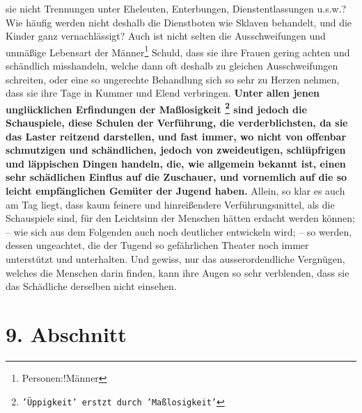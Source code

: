 sie nicht Trennungen unter Eheleuten, Enterbungen, Dienstentlassungen u.s.w.?
Wie häufig werden nicht deshalb die Dienstboten wie 
Sklaven behandelt, und die
Kinder ganz vernachlässigt? Auch ist nicht selten die Ausschweifungen und
unmäßige Lebensart der Männer\footnote{Personen:!Männer} Schuld,
dass sie ihre Frauen gering achten und
schändlich misshandeln, welche dann oft deshalb zu gleichen Ausschweifungen
schreiten, oder eine so ungerechte Behandlung sich so sehr zu Herzen nehmen, dass
sie ihre Tage in Kummer und Elend verbringen.
\label{ref:15_08_schauspiel}
\textbf{Unter allen jenen unglücklichen
Erfindungen der Maßlosigkeit
\footnote{\texttt{'Üppigkeit' erstzt durch 'Maßlosigkeit'}} 
sind jedoch die Schauspiele, diese Schulen der
Verführung, die verderblichsten, da sie das Laster reitzend darstellen, und fast
immer, wo nicht von offenbar schmutzigen und schändlichen, jedoch von
zweideutigen, schlüpfrigen und läppischen Dingen handeln, die, wie allgemein
bekannt ist, einen sehr schädlichen Einflus auf die Zuschauer, und vornemlich
auf die so leicht empfänglichen Gemüter der Jugend haben.} Allein, so klar es
auch am Tag liegt, dass kaum feinere und hinreißendere Verführungsmittel, als
die Schauspiele sind, für den Leichtsinn der Menschen hätten erdacht werden
können; -- wie sich aus dem Folgenden auch noch deutlicher entwickeln wird; --
so werden, dessen ungeachtet, die der Tugend so gefährlichen Theater noch immer
unterstützt und unterhalten. Und gewiss, nur das ausserordendliche Vergnügen,
welches die Menschen darin finden, kann ihre Augen so sehr verblenden, dass sie
das Schädliche derselben nicht einsehen.

\section{9. Abschnitt} \label{kap15_ab9}

